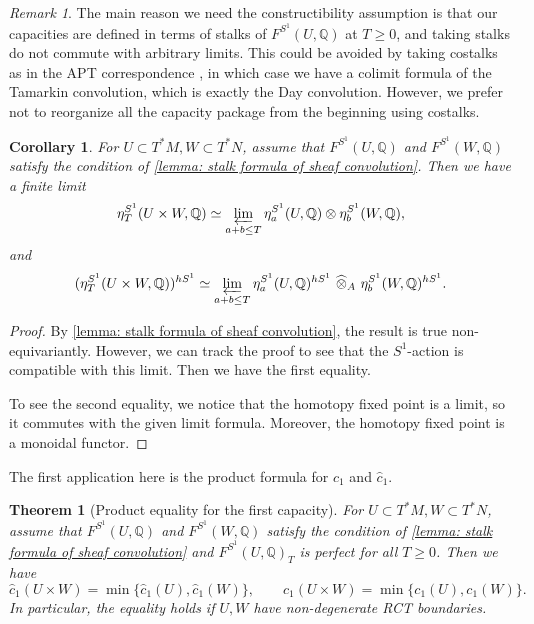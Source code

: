 \documentclass[11pt]{amsart}
\numberwithin{equation}{section}
\theoremstyle{plain}
\newtheorem{Thm}{Theorem}[section]
\newtheorem{Coro}[coro]{Corollary}
\theoremstyle{definition}
\theoremstyle{remark}
\newtheorem{RMK}[rmk]{Remark}
\newcommand{\bQ} { {\mathbb{Q}}}
\begin{document}
\begin{RMK}
The main reason we need the constructibility assumption is that our capacities are defined in terms of stalks of $F^{S^1}(U, \bQ)$ at $T \geq 0$, and taking stalks do not commute with arbitrary limits. This could be avoided by taking costalks as in the APT correspondence \cite{APT-Tatsuki-Zhang}, in which case we have a colimit formula of the Tamarkin convolution, which is exactly the Day convolution. However, we prefer not to reorganize all the capacity package from the beginning using costalks.
\end{RMK}










\begin{Coro}\label{coro:  stalk formula of fundamental class convolution}For $U\subset T^*M,W \subset T^*N$, assume that $F^{S^1}(U,\bQ)$ and $F^{S^1}(W,\bQ)$ satisfy the condition of \autoref{lemma: stalk formula of sheaf convolution}. Then we have a finite limit 
\[\eta_T^{S^1}(U\times W,\bQ) \simeq \varprojlim_{a+b\leq T} \eta^{S^1}_a(U,\bQ)\otimes \eta^{S^1}_b(W,\bQ),\]
and
\[(\eta_T^{S^1}(U\times W,\bQ) )^{hS^1}\simeq   \varprojlim_{a+b\leq T}\eta^{S^1}_a(U,\bQ)^{hS^1}~\widehat\otimes_A ~\eta^{S^1}_b(W,\bQ)^{hS^1}.\]
\end{Coro}
\begin{proof}By \autoref{lemma: stalk formula of sheaf convolution}, the result is true non-equivariantly. However, we can track the proof to see that the $S^1$-action is compatible with this limit. Then we have the first equality.

To see the second equality, we notice that the homotopy fixed point is a limit, so it commutes with the given limit formula. Moreover, the homotopy fixed point is a monoidal functor.
\end{proof}
The first application here is the product formula for $c_1$ and $\widehat{c}_1$.
\begin{Thm}[Product equality for the first capacity]\label{Product formula for c1 RCT}For $U \subset T^*M,W\subset T^*N$, assume that $F^{S^1}(U,\bQ)$ and $F^{S^1}(W,\bQ)$ satisfy the condition of \autoref{lemma: stalk formula of sheaf convolution} and $F^{S^1}(U,\bQ)_T$ is perfect for all $T\geq 0$. 
Then we have 
\[\widehat{c}_1(U \times W) = \min\{\widehat{c}_1(U), \widehat{c}_1(W)\},\qquad {c}_1(U \times W) = \min\{{c}_1(U), {c}_1(W)\}.\]
In particular, the equality holds if $U, W$ have non-degenerate RCT boundaries.
\end{Thm}
\end{document}
